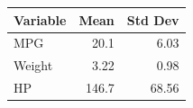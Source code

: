 \begin{tabular}{lrr}
\toprule
Variable & Mean & Std Dev \\
\midrule
MPG & 20.1 & 6.03 \\
Weight & 3.22 & 0.98 \\
HP & 146.7 & 68.56 \\
\bottomrule
\end{tabular}
